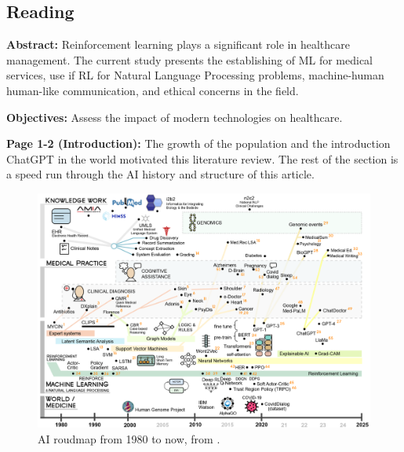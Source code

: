\subsection{Reading}
    \textbf{Abstract:}
    Reinforcement learning plays a significant role in healthcare management. The current study presents the establishing of ML for medical services, use if RL for Natural Language Processing problems, machine-human human-like communication, and ethical concerns in the field.
    
    \textbf{Objectives:}
    Assess the impact of modern technologies on healthcare.
    
    \textbf{Page 1-2 (Introduction):}
    The growth of the population and the introduction ChatGPT in the world motivated this literature review. The rest of the section is a speed run through the AI history and structure of this article.
    \begin{figure}[H]
        \centering
        \includegraphics[width=1\textwidth]{figures/SR0022US23/fig1.png}
        \caption{AI roudmap from 1980 to now, from \cite{x090}.}
        \label{fig1:SR0022US23}
    \end{figure}
    
